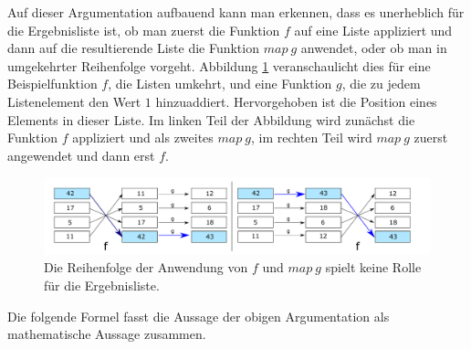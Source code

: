 Auf dieser Argumentation aufbauend kann man erkennen, dass es unerheblich für die Ergebnisliste ist, ob man zuerst die
Funktion $f$ auf eine Liste appliziert und dann auf die resultierende Liste die Funktion $map\ g$ anwendet, oder ob man
in umgekehrter Reihenfolge vorgeht. Abbildung \ref{fig:fmapg} veranschaulicht dies für eine Beispielfunktion $f$, die Listen
umkehrt, und eine Funktion $g$, die zu jedem Listenelement den Wert $1$ hinzuaddiert. Hervorgehoben ist die Position
eines Elements in dieser Liste. Im linken Teil der Abbildung wird zunächst die Funktion $f$ appliziert und als zweites
$map\ g$, im rechten Teil wird $map\ g$ zuerst angewendet und dann erst $f$.

\begin{figure}[ht]
\centering
\includegraphics[width=430px]{fmapg}
\caption{Die Reihenfolge der Anwendung von $f$ und $map\ g$ spielt keine Rolle für die Ergebnisliste.}
\label{fig:fmapg}
\end{figure}

Die folgende Formel fasst die Aussage der obigen Argumentation als mathematische Aussage zusammen.




